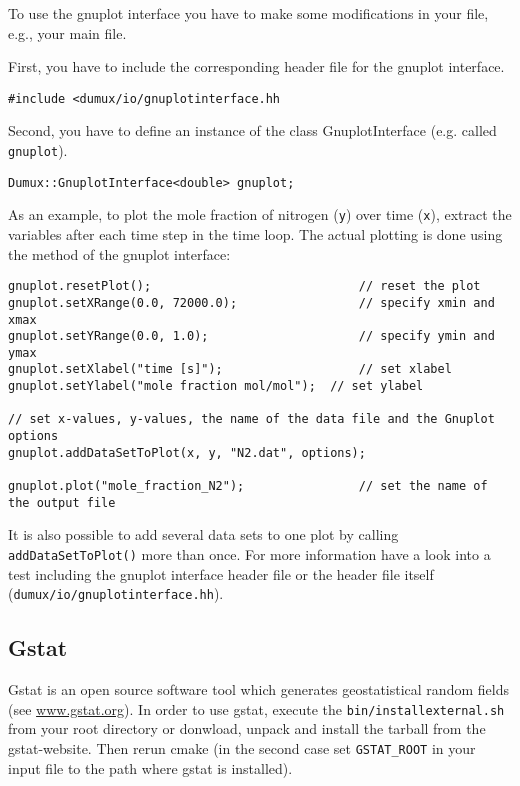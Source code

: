 To use the gnuplot interface you have to make some modifications in your file, e.g., your main file.

First, you have to include the corresponding header file for the gnuplot interface. 
\begin{lstlisting}[style=DumuxCode]
#include <dumux/io/gnuplotinterface.hh
\end{lstlisting}

Second, you have to define an instance of the class GnuplotInterface (e.g. called \texttt{gnuplot}).
\begin{lstlisting}[style=DumuxCode]
Dumux::GnuplotInterface<double> gnuplot;
\end{lstlisting}

As an example, to plot the mole fraction of nitrogen (\texttt{y}) over time (\texttt{x}),
extract the variables after each time step in the time loop.
The actual plotting is done using the method of the gnuplot interface:

\begin{lstlisting}[style=DumuxCode]
gnuplot.resetPlot();                             // reset the plot
gnuplot.setXRange(0.0, 72000.0);                 // specify xmin and xmax  
gnuplot.setYRange(0.0, 1.0);                     // specify ymin and ymax
gnuplot.setXlabel("time [s]");                   // set xlabel
gnuplot.setYlabel("mole fraction mol/mol");  // set ylabel

// set x-values, y-values, the name of the data file and the Gnuplot options
gnuplot.addDataSetToPlot(x, y, "N2.dat", options); 

gnuplot.plot("mole_fraction_N2");                // set the name of the output file
\end{lstlisting}

It is also possible to add several data sets to one plot by calling \texttt{addDataSetToPlot()} more than once.
For more information have a look into a test including the gnuplot interface header file or
the header file itself (\texttt{dumux/io/gnuplotinterface.hh}).


\subsection{Gstat}
Gstat is an open source software tool which generates geostatistical random fields (see \url{www.gstat.org}).
In order to use gstat, execute the \texttt{bin/installexternal.sh} from your \Dumux root
directory or donwload, unpack and install the tarball from the gstat-website.
Then rerun cmake (in the second case set \texttt{GSTAT\_ROOT} in your input file to the
path where gstat is installed).


